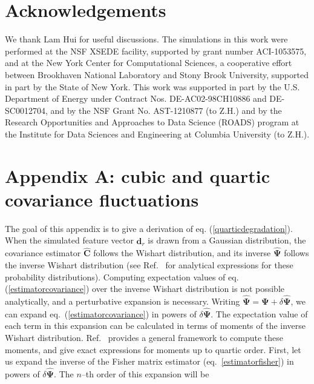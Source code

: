 \documentclass[reprint,aps,prd,superscriptaddress,showkeys,showpacs]{revtex4-1}
\newcommand{\bb}[1]{\mathbf{#1}}
\newcommand{\bbh}[1]{\mathbf{\hat{#1}}}
\begin{document}
 

\section*{Acknowledgements}
We thank Lam Hui for useful discussions.  The simulations in this work
were performed at the NSF XSEDE facility, supported by grant number
ACI-1053575, and at the New York Center for Computational Sciences, a
cooperative effort between Brookhaven National Laboratory and Stony
Brook University, supported in part by the State of New York. This
work was supported in part by the U.S. Department of Energy under
Contract Nos. DE-AC02-98CH10886 and DE-SC0012704, and by the NSF Grant
No. AST-1210877 (to Z.H.) and by the Research Opportunities and
Approaches to Data Science (ROADS) program at the Institute for Data
Sciences and Engineering at Columbia University (to Z.H.).  



\section*{Appendix A: cubic and quartic covariance fluctuations}
\label{appendixA}

The goal of this appendix is to give a derivation of
eq. (\ref{quarticdegradation}). When the simulated feature vector
$\bbh{d}_r$ is drawn from a Gaussian distribution, the covariance
estimator $\bbh{C}$ follows the Wishart distribution, and its inverse
$\bbh{\Psi}$ follows the inverse Wishart distribution (see
Ref.~\citep{Taylor12} for analytical expressions for these probability
distributions). Computing expectation values of
eq. (\ref{estimatorcovariance}) over the inverse Wishart distribution
is not possible analytically, and a perturbative expansion is
necessary. Writing $\bbh{\Psi}=\bb{\Psi}+\delta\bbh{\Psi}$, we can
expand eq.~(\ref{estimatorcovariance}) 
in powers of $\delta\bbh{\Psi}$. The expectation value of each term in
this expansion can be calculated in terms of moments of the inverse
Wishart distribution. Ref.~\citep{MasumotoWishart} provides a general
framework to compute these moments, and give exact expressions for
moments up to quartic order. First, let us expand the inverse of the
Fisher matrix estimator (eq.~\ref{estimatorfisher}) in powers of
$\delta\bbh{\Psi}$. The $n$--th order of this expansion will be
\end{document}
